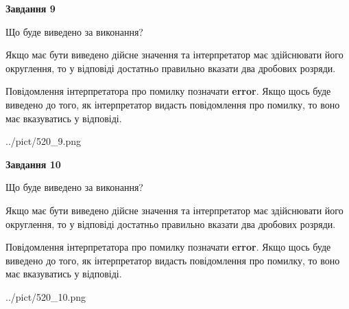 \documentclass[12pt, ukrainian]{article}
\begin{document}
{\begin {Large}
{\begin {center}\textbf{Завдання 9}\end {center}}\par
Що буде виведено за виконання? \par

Якщо має бути виведено дійсне значення та інтерпретатор має здійснювати його округлення, 
то у відповіді достатньо правильно вказати два дробових розряди.

Повідомлення інтерпретатора про помилку позначати \textbf{error}.
Якщо щось буде виведено до того, як інтерпретатор видасть повідомлення про помилку, 
то воно має вказуватись у відповіді. \par

\begin{center}
	{../pict/520_9.png}
\end{center}
\newpage

{\begin {center}\textbf{Завдання 10}\end {center}}\par
Що буде виведено за виконання? \par

Якщо має бути виведено дійсне значення та інтерпретатор має здійснювати його округлення, 
то у відповіді достатньо правильно вказати два дробових розряди.

Повідомлення інтерпретатора про помилку позначати \textbf{error}.
Якщо щось буде виведено до того, як інтерпретатор видасть повідомлення про помилку, 
то воно має вказуватись у відповіді. \par

\begin{center}
	{../pict/520_10.png}
\end{center}
\newpage

\end {Large}}
\end{document}
